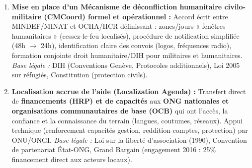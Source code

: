 \documentclass[11pt]{article}
\newcommand{\cle}[1]{{\popxbold\color{popdark}#1}}
\begin{document}
\begin{corrige}
\begin{enumerate}
\begin{enumerate}
        \item \textbf{Mise en place d'un \cle{Mécanisme de déconfliction humanitaire civilo-militaire (CMCoord) formel et opérationnel :}} Accord écrit entre MINDEF/MINAT et OCHA/HCR définissant : zones/jours « fenêtres humanitaires » (cessez-le-feu localisés), procédure de notification simplifiée (48h $\to$ 24h), identification claire des convois (logos, fréquences radio), formation conjointe droit humanitaire/DIH pour militaires et humanitaires. \emph{Base légale :} DIH (Conventions Genève, Protocoles additionnels), Loi 2005 sur réfugiés, Constitution (protection civils).
        \item \textbf{\cle{Localisation accrue de l'aide (Localization Agenda) :}} Transfert direct de \textbf{financements (HRP) et de capacités} aux \textbf{ONG nationales et organisations communautaires de base (OCB)} qui ont l'accès, la confiance et la connaissance du terrain (langues, coutumes, réseaux). Appui technique (renforcement capacités gestion, reddition comptes, protection) par ONU/ONGI. \emph{Base légale :} Loi sur la liberté d'association (1990), Convention de partenariat État-ONG, Grand Bargain (engagement 2016 : 25\% financement direct aux acteurs locaux).
    \end{enumerate}
\end{enumerate}
\end{corrige}
\end{document}
